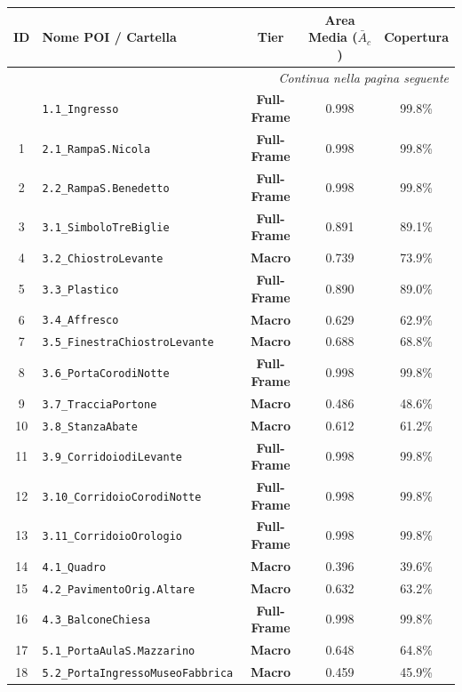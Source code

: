 \begingroup
\small
\setlength{\tabcolsep}{4pt}
\begin{longtable}{cp{5.6cm}ccc}
\toprule
\textbf{ID} & \textbf{Nome POI / Cartella} & \textbf{Tier} & \textbf{Area Media ($\bar{A}_c$)} & \textbf{Copertura} \\
\midrule
\endhead
\midrule
\multicolumn{5}{r}{\small\textit{Continua nella pagina seguente}} \\
\midrule
\endfoot
\bottomrule
\endlastfoot
0 & \texttt{1.1\_Ingresso} & \textbf{Full-Frame} & 0.998 & 99.8\% \\
1 & \texttt{2.1\_RampaS.Nicola} & \textbf{Full-Frame} & 0.998 & 99.8\% \\
2 & \texttt{2.2\_RampaS.Benedetto} & \textbf{Full-Frame} & 0.998 & 99.8\% \\
3 & \texttt{3.1\_SimboloTreBiglie} & \textbf{Full-Frame} & 0.891 & 89.1\% \\
4 & \texttt{3.2\_ChiostroLevante} & \textbf{Macro} & 0.739 & 73.9\% \\
5 & \texttt{3.3\_Plastico} & \textbf{Full-Frame} & 0.890 & 89.0\% \\
6 & \texttt{3.4\_Affresco} & \textbf{Macro} & 0.629 & 62.9\% \\
7 & \texttt{3.5\_FinestraChiostroLevante} & \textbf{Macro} & 0.688 & 68.8\% \\
8 & \texttt{3.6\_PortaCorodiNotte} & \textbf{Full-Frame} & 0.998 & 99.8\% \\
9 & \texttt{3.7\_TracciaPortone} & \textbf{Macro} & 0.486 & 48.6\% \\
10 & \texttt{3.8\_StanzaAbate} & \textbf{Macro} & 0.612 & 61.2\% \\
11 & \texttt{3.9\_CorridoiodiLevante} & \textbf{Full-Frame} & 0.998 & 99.8\% \\
12 & \texttt{3.10\_CorridoioCorodiNotte} & \textbf{Full-Frame} & 0.998 & 99.8\% \\
13 & \texttt{3.11\_CorridoioOrologio} & \textbf{Full-Frame} & 0.998 & 99.8\% \\
14 & \texttt{4.1\_Quadro} & \textbf{Macro} & 0.396 & 39.6\% \\
15 & \texttt{4.2\_PavimentoOrig.Altare} & \textbf{Macro} & 0.632 & 63.2\% \\
16 & \texttt{4.3\_BalconeChiesa} & \textbf{Full-Frame} & 0.998 & 99.8\% \\
17 & \texttt{5.1\_PortaAulaS.Mazzarino} & \textbf{Macro} & 0.648 & 64.8\% \\
18 & \texttt{5.2\_PortaIngressoMuseoFabbrica} & \textbf{Macro} & 0.459 & 45.9\% \\

\end{longtable}

